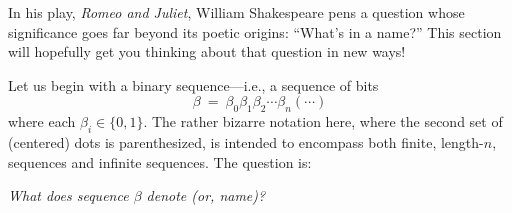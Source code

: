 In his play, {\it Romeo and Juliet}, William Shakespeare pens a question whose significance goes far beyond its poetic origins: ``What's in a name?''  This section will hopefully get you thinking about that question in new ways!

Let us begin with a binary sequence---i.e., a sequence of bits
\[ \beta \ = \ \beta_0 \beta_1 \beta_2 \cdots \beta_n (\cdots) \]
where each $\beta_i \in \{0,1\}$.  The rather bizarre notation here, where the second set of (centered) dots is parenthesized, is intended to encompass both finite, length-$n$, sequences and infinite sequences.  The question is:

\smallskip

{\em What does sequence $\beta$ denote (or, name)?}

\smallskip

